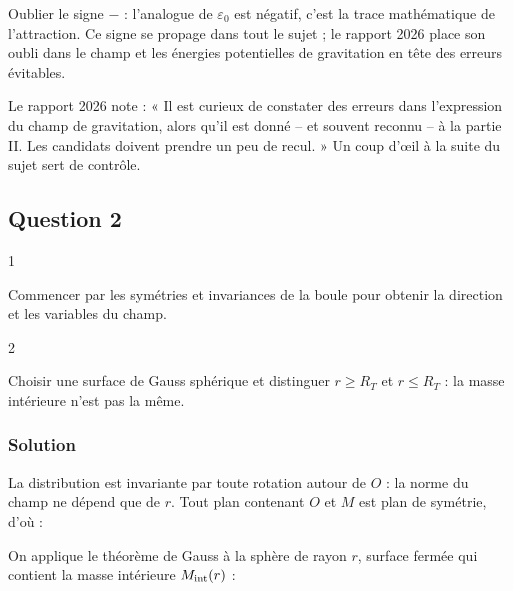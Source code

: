 \documentclass[11pt,a4paper]{article}
\newcommand{\equationajustee}[1]{%
  \sbox{\boiteequation}{$\displaystyle #1$}%
  \ifdim\wd\boiteequation>\linewidth
    \[\resizebox{\linewidth}{!}{\usebox{\boiteequation}}\]%
  \else
    \[#1\]%
  \fi}
\begin{document}
\begin{piege}

Oublier le signe \(-\) : l'analogue de \(\varepsilon_0\) est négatif, c'est la trace mathématique de l'attraction. Ce signe se propage dans tout le sujet ; le rapport 2026 place son oubli dans le champ et les énergies potentielles de gravitation en tête des erreurs évitables.

\end{piege}

\begin{jury}

Le rapport 2026 note : « Il est curieux de constater des erreurs dans l'expression du champ de gravitation, alors qu'il est donné -- et souvent reconnu -- à la partie II. Les candidats doivent prendre un peu de recul. » Un coup d'œil à la suite du sujet sert de contrôle.

\end{jury}

\hypertarget{question-2}{%
\subsection{Question 2}\label{question-2}}

\begin{indication}{1}

Commencer par les symétries et invariances de la boule pour obtenir la direction et les variables du champ.

\end{indication}

\begin{indication}{2}

Choisir une surface de Gauss sphérique et distinguer \(r\ge R_T\) et \(r\le R_T\) : la masse intérieure n'est pas la même.

\end{indication}

\hypertarget{solution-1}{%
\subsubsection{Solution}\label{solution-1}}

La distribution est invariante par toute rotation autour de \(O\) : la norme du champ ne dépend que de \(r\). Tout plan contenant \(O\) et \(M\) est plan de symétrie, d'où :

\equationajustee{\vec G_T(M)=G(r)\,\vec u_r}

On applique le théorème de Gauss à la sphère de rayon \(r\), surface fermée qui contient la masse intérieure \(M_{\rm int}(r)\) :
\end{document}
